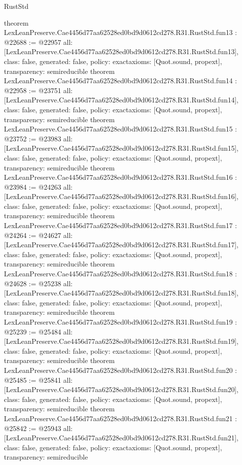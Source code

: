 \begin{lexlean}{RustStd}
\begin{coremodule}
{}
theorem LexLeanPreserve.Cae4456d77aa62528ed0bd9d0612cd278.R31.RustStd.fun13 : @22688 := @22957 {
  all: [LexLeanPreserve.Cae4456d77aa62528ed0bd9d0612cd278.R31.RustStd.fun13],
  class: false,
  generated: false,
  policy: exact{axioms: [Quot.sound, propext]},
  transparency: semireducible
}
theorem LexLeanPreserve.Cae4456d77aa62528ed0bd9d0612cd278.R31.RustStd.fun14 : @22958 := @23751 {
  all: [LexLeanPreserve.Cae4456d77aa62528ed0bd9d0612cd278.R31.RustStd.fun14],
  class: false,
  generated: false,
  policy: exact{axioms: [Quot.sound, propext]},
  transparency: semireducible
}
theorem LexLeanPreserve.Cae4456d77aa62528ed0bd9d0612cd278.R31.RustStd.fun15 : @23752 := @23983 {
  all: [LexLeanPreserve.Cae4456d77aa62528ed0bd9d0612cd278.R31.RustStd.fun15],
  class: false,
  generated: false,
  policy: exact{axioms: [Quot.sound, propext]},
  transparency: semireducible
}
theorem LexLeanPreserve.Cae4456d77aa62528ed0bd9d0612cd278.R31.RustStd.fun16 : @23984 := @24263 {
  all: [LexLeanPreserve.Cae4456d77aa62528ed0bd9d0612cd278.R31.RustStd.fun16],
  class: false,
  generated: false,
  policy: exact{axioms: [Quot.sound, propext]},
  transparency: semireducible
}
theorem LexLeanPreserve.Cae4456d77aa62528ed0bd9d0612cd278.R31.RustStd.fun17 : @24264 := @24627 {
  all: [LexLeanPreserve.Cae4456d77aa62528ed0bd9d0612cd278.R31.RustStd.fun17],
  class: false,
  generated: false,
  policy: exact{axioms: [Quot.sound, propext]},
  transparency: semireducible
}
theorem LexLeanPreserve.Cae4456d77aa62528ed0bd9d0612cd278.R31.RustStd.fun18 : @24628 := @25238 {
  all: [LexLeanPreserve.Cae4456d77aa62528ed0bd9d0612cd278.R31.RustStd.fun18],
  class: false,
  generated: false,
  policy: exact{axioms: [Quot.sound, propext]},
  transparency: semireducible
}
theorem LexLeanPreserve.Cae4456d77aa62528ed0bd9d0612cd278.R31.RustStd.fun19 : @25239 := @25484 {
  all: [LexLeanPreserve.Cae4456d77aa62528ed0bd9d0612cd278.R31.RustStd.fun19],
  class: false,
  generated: false,
  policy: exact{axioms: [Quot.sound, propext]},
  transparency: semireducible
}
theorem LexLeanPreserve.Cae4456d77aa62528ed0bd9d0612cd278.R31.RustStd.fun20 : @25485 := @25841 {
  all: [LexLeanPreserve.Cae4456d77aa62528ed0bd9d0612cd278.R31.RustStd.fun20],
  class: false,
  generated: false,
  policy: exact{axioms: [Quot.sound, propext]},
  transparency: semireducible
}
theorem LexLeanPreserve.Cae4456d77aa62528ed0bd9d0612cd278.R31.RustStd.fun21 : @25842 := @25943 {
  all: [LexLeanPreserve.Cae4456d77aa62528ed0bd9d0612cd278.R31.RustStd.fun21],
  class: false,
  generated: false,
  policy: exact{axioms: [Quot.sound, propext]},
  transparency: semireducible
}
\end{coremodule}
\end{lexlean}
